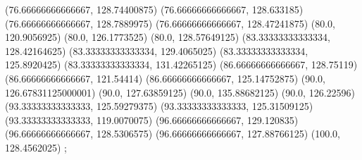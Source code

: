 {{{		(76.66666666666667, 128.74400875)
		(76.66666666666667, 128.633185)
		(76.66666666666667, 128.7889975)
		(76.66666666666667, 128.47241875)
		(80.0, 120.9056925)
		(80.0, 126.1773525)
		(80.0, 128.57649125)
		(83.33333333333334, 128.42164625)
		(83.33333333333334, 129.4065025)
		(83.33333333333334, 125.8920425)
		(83.33333333333334, 131.42265125)
		(86.66666666666667, 128.75119)
		(86.66666666666667, 121.54414)
		(86.66666666666667, 125.14752875)
		(90.0, 126.67831125000001)
		(90.0, 127.63859125)
		(90.0, 135.88682125)
		(90.0, 126.22596)
		(93.33333333333333, 125.59279375)
		(93.33333333333333, 125.31509125)
		(93.33333333333333, 119.0070075)
		(96.66666666666667, 129.120835)
		(96.66666666666667, 128.5306575)
		(96.66666666666667, 127.88766125)
		(100.0, 128.4562025)
	};

}
}
